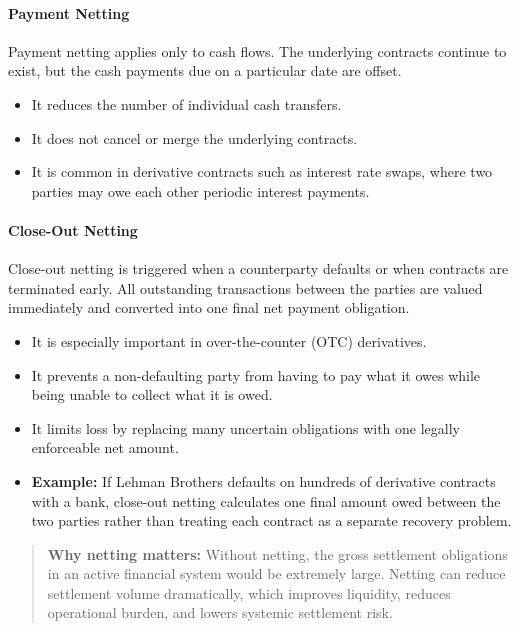 \documentclass[12pt,openany]{book}
\begin{document}
\paragraph{Payment Netting}
Payment netting applies only to cash flows. The underlying contracts continue to exist, but the cash payments due on a particular date are offset.

\begin{itemize}[leftmargin=*]
    \item It reduces the number of individual cash transfers.
    \item It does not cancel or merge the underlying contracts.
    \item It is common in derivative contracts such as interest rate swaps, where two parties may owe each other periodic interest payments.
\end{itemize}

\paragraph{Close-Out Netting}
Close-out netting is triggered when a counterparty defaults or when contracts are terminated early. All outstanding transactions between the parties are valued immediately and converted into one final net payment obligation.

\begin{itemize}[leftmargin=*]
    \item It is especially important in over-the-counter (OTC) derivatives.
    \item It prevents a non-defaulting party from having to pay what it owes while being unable to collect what it is owed.
    \item It limits loss by replacing many uncertain obligations with one legally enforceable net amount.
    \item \textbf{Example:} If Lehman Brothers defaults on hundreds of derivative contracts with a bank, close-out netting calculates one final amount owed between the two parties rather than treating each contract as a separate recovery problem.
\end{itemize}

\begin{quote}
\textbf{Why netting matters:} Without netting, the gross settlement obligations in an active financial system would be extremely large. Netting can reduce settlement volume dramatically, which improves liquidity, reduces operational burden, and lowers systemic settlement risk.
\end{quote}
\end{document}
